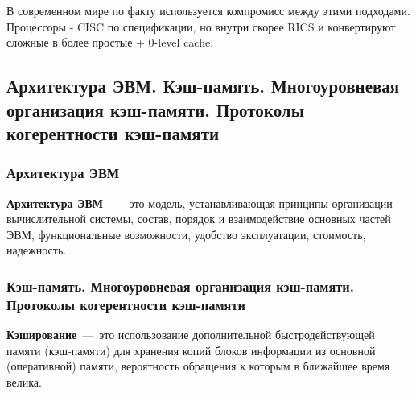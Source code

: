 \documentclass{article}
\begin{document}
В современном мире по факту используется компромисс между этими подходами. Процессоры - CISC по спецификации, но внутри скорее RICS и конвертируют сложные в более простые + 0-level cache.

\subsection{Архитектура ЭВМ. Кэш-память. Многоуровневая организация кэш-памяти. Протоколы когерентности кэш-памяти}

\subsubsection{Архитектура ЭВМ}
\textbf{Архитектура ЭВМ}~---~
это модель, устанавливающая принципы организации вычислительной системы, состав, 
порядок и взаимодействие основных частей ЭВМ, функциональные возможности, 
удобство эксплуатации, стоимость, надежность.

\subsubsection{Кэш-память. Многоуровневая организация кэш-памяти. Протоколы когерентности кэш-памяти}
\textbf{Кэширование}~---~это использование дополнительной быстродействующей памяти (кэш-памяти) для хранения копий блоков информации из основной (оперативной) памяти, вероятность обращения к которым в ближайшее время велика.
\end{document}
